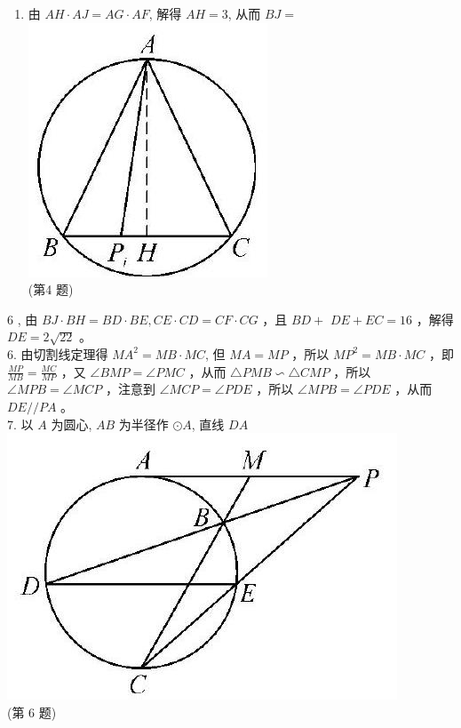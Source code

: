 \documentclass[10pt]{article}
\begin{document}
\begin{enumerate}
  \item 由 $A H \cdot A J=A G \cdot A F$, 解得 $A H=3$, 从而 $B J=$\\
\includegraphics[max width=\textwidth, center]{2024_10_30_66b8e5e701da2093c133g-099}\\
(第4 题)
\end{enumerate}

6 , 由 $B J \cdot B H=B D \cdot B E, C E \cdot C D=C F \cdot C G$ ，且 $B D+$ $D E+E C=16$ ，解得 $D E=2 \sqrt{22}$ 。\\
6. 由切割线定理得 $M A^{2}=M B \cdot M C$, 但 $M A=M P$ ，所以 $M P^{2}=M B \cdot M C$ ，即 $\frac{M P}{M B}=\frac{M C}{M P}$ ，又 $\angle B M P=\angle P M C$ ，从而 $\triangle P M B \backsim \triangle C M P$ ，所以 $\angle M P B=\angle M C P$ ，注意到 $\angle M C P=\angle P D E$ ，所以 $\angle M P B=\angle P D E$ ，从而 $D E / / P A$ 。\\
7. 以 $A$ 为圆心, $A B$ 为半径作 $\odot A$, 直线 $D A$\\
\includegraphics[max width=\textwidth, center]{2024_10_30_66b8e5e701da2093c133g-099(1)}\\
(第 6 题)
\end{document}
